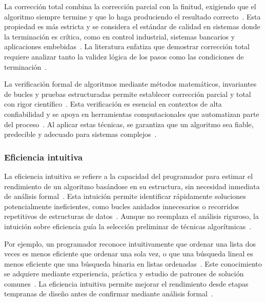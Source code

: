 \documentclass[12pt,twoside]{book}
\begin{document}
						La corrección total combina la corrección parcial con la finitud, exigiendo que el algoritmo siempre termine y que lo haga produciendo el resultado correcto~\cite{Tanenbaum2021Structured}. Esta propiedad es más estricta y se considera el estándar de calidad en sistemas donde la terminación es crítica, como en control industrial, sistemas bancarios y aplicaciones embebidas~\cite{Sommerville2015Software}. La literatura enfatiza que demostrar corrección total requiere analizar tanto la validez lógica de los pasos como las condiciones de terminación~\cite{Pressman2019Software}.
						
						La verificación formal de algoritmos mediante métodos matemáticos, invariantes de bucles y pruebas estructuradas permite establecer corrección parcial y total con rigor científico~\cite{Stallings2021Computer}. Esta verificación es esencial en contextos de alta confiabilidad y se apoya en herramientas computacionales que automatizan parte del proceso~\cite{Sommerville2015Software}. Al aplicar estas técnicas, se garantiza que un algoritmo sea fiable, predecible y adecuado para sistemas complejos~\cite{Pressman2019Software}.
		
					\subsubsection{Eficiencia intuitiva}
						La eficiencia intuitiva se refiere a la capacidad del programador para estimar el rendimiento de un algoritmo basándose en su estructura, sin necesidad inmediata de análisis formal~\cite{Pressman2019Software}. Esta intuición permite identificar rápidamente soluciones potencialmente ineficientes, como bucles anidados innecesarios o recorridos repetitivos de estructuras de datos~\cite{Sommerville2015Software}. Aunque no reemplaza el análisis riguroso, la intuición sobre eficiencia guía la selección preliminar de técnicas algorítmicas~\cite{Stallings2021Computer}.
						
						Por ejemplo, un programador reconoce intuitivamente que ordenar una lista dos veces es menos eficiente que ordenar una sola vez, o que una búsqueda lineal es menos eficiente que una búsqueda binaria en listas ordenadas~\cite{Tanenbaum2021Structured}. Este conocimiento se adquiere mediante experiencia, práctica y estudio de patrones de solución comunes~\cite{Gaddis2022Starting}. La eficiencia intuitiva permite mejorar el rendimiento desde etapas tempranas de diseño antes de confirmar mediante análisis formal~\cite{Pressman2019Software}.
		
\end{document}

